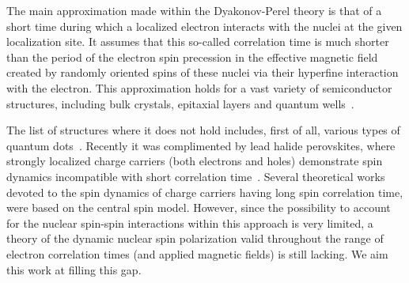 \documentclass[prl,nobibnotes,twocolumn,aps,longbibliography,superscriptaddress,notoc]{revtex4-1}
\begin{document}
The main approximation made within the Dyakonov-Perel theory is that of a short time during which a localized electron interacts with the nuclei at the given localization site. It assumes that this so-called correlation time is much shorter than the period of the electron spin precession in the effective magnetic field created by randomly oriented spins of these nuclei via their hyperfine interaction with the electron. This approximation holds for a vast variety of semiconductor structures, including bulk crystals, epitaxial layers and quantum wells~\cite{dyakonov_book,book_Glazov}.

The list of structures where it does not hold includes, first of all, various types of quantum dots~\cite{A.Greilich09282007,Reilly817,xu09,maletinsky2009breakdown,Gangloff2021,cai2024nuclearspin}. Recently it was complimented by lead halide perovskites, where strongly localized charge carriers (both electrons and holes) demonstrate spin dynamics incompatible with short correlation time~\cite{kirstein2023squeezed,kudlacik2024optical}. Several theoretical works~\cite{merkulov02,PhysRevLett.88.186802,PhysRevB.81.115107,Glazov_hopping,PhysRevLett.126.216804} devoted to the spin dynamics of charge carriers having long spin correlation time, were based on the central spin model. However, since the possibility to account for the nuclear spin-spin interactions within this approach is very limited, a theory of the dynamic nuclear spin polarization valid throughout the range of electron correlation times (and applied magnetic fields) is still lacking. We aim this work at filling this gap.
\end{document}
